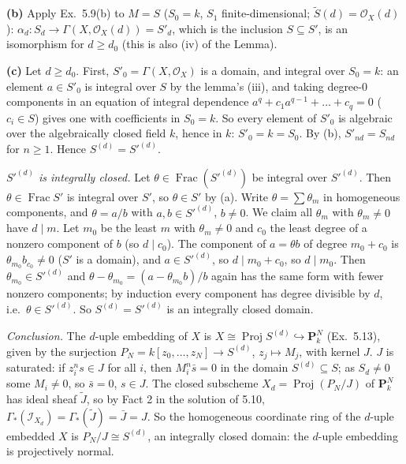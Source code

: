 \documentclass[11pt]{article}
\begin{document}
\textbf{(b)} Apply Ex.\ 5.9(b) to $M=S$ ($S_0=k$, $S_1$ finite-dimensional; $\widetilde S(d)=\mathcal O_X(d)$): $\alpha_d:S_d\to\Gamma(X,\mathcal O_X(d))=S'_d$, which is the inclusion $S\subseteq S'$, is an isomorphism for $d\ge d_0$ (this is also (iv) of the Lemma).

\textbf{(c)} Let $d\ge d_0$. First, $S'_0=\Gamma(X,\mathcal O_X)$ is a domain, and integral over $S_0=k$: an element $a\in S'_0$ is integral over $S$ by the lemma's (iii), and taking degree-$0$ components in an equation of integral dependence $a^q+c_1a^{q-1}+\dots+c_q=0$ ($c_i\in S$) gives one with coefficients in $S_0=k$. So every element of $S'_0$ is algebraic over the algebraically closed field $k$, hence in $k$: $S'_0=k=S_0$. By (b), $S'_{nd}=S_{nd}$ for $n\ge1$. Hence $S^{(d)}=S'^{(d)}$.

\emph{$S'^{(d)}$ is integrally closed.} Let $\theta\in\operatorname{Frac}(S'^{(d)})$ be integral over $S'^{(d)}$. Then $\theta\in\operatorname{Frac}S'$ is integral over $S'$, so $\theta\in S'$ by (a). Write $\theta=\sum\theta_m$ in homogeneous components, and $\theta=a/b$ with $a,b\in S'^{(d)}$, $b\ne0$. We claim all $\theta_m$ with $\theta_m\neq0$ have $d\mid m$. Let $m_0$ be the least $m$ with $\theta_m\ne0$ and $c_0$ the least degree of a nonzero component of $b$ (so $d\mid c_0$). The component of $a=\theta b$ of degree $m_0+c_0$ is $\theta_{m_0}b_{c_0}\neq0$ ($S'$ is a domain), and $a\in S'^{(d)}$, so $d\mid m_0+c_0$, so $d\mid m_0$. Then $\theta_{m_0}\in S'^{(d)}$ and $\theta-\theta_{m_0}=(a-\theta_{m_0}b)/b$ again has the same form with fewer nonzero components; by induction every component has degree divisible by $d$, i.e.\ $\theta\in S'^{(d)}$. So $S^{(d)}=S'^{(d)}$ is an integrally closed domain.

\emph{Conclusion.} The $d$-uple embedding of $X$ is $X\cong\operatorname{Proj}S^{(d)}\hookrightarrow\mathbf P^N_k$ (Ex.\ 5.13), given by the surjection $P_N=k[z_0,\dots,z_N]\to S^{(d)}$, $z_j\mapsto M_j$, with kernel $J$. $J$ is saturated: if $z_i^ns\in J$ for all $i$, then $M_i^n\bar s=0$ in the domain $S^{(d)}\subseteq S$; as $S_d\ne0$ some $M_i\neq0$, so $\bar s=0$, $s\in J$. The closed subscheme $X_d=\operatorname{Proj}(P_N/J)$ of $\mathbf P^N_k$ has ideal sheaf $\widetilde J$, so by Fact 2 in the solution of 5.10, $\Gamma_*(\mathcal I_{X_d})=\Gamma_*(\widetilde J)=\bar J=J$. So the homogeneous coordinate ring of the $d$-uple embedded $X$ is $P_N/J\cong S^{(d)}$, an integrally closed domain: the $d$-uple embedding is projectively normal.
\end{document}
